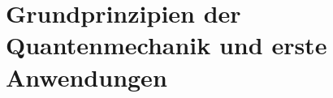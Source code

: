 \chapter{Grundprinzipien der Quantenmechanik und erste Anwendungen} %
\label{Grundprinzipien_der_Quantenmechanik_und_erste_Anwendungen}

%
